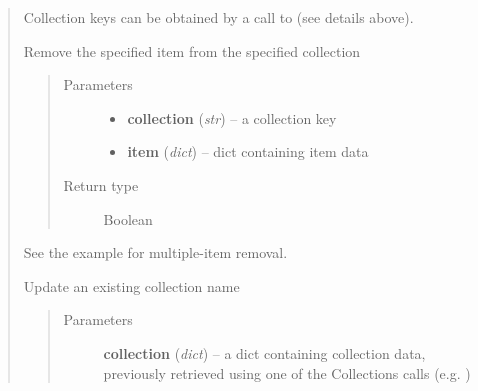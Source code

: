 \documentclass[letterpaper,10pt,english]{sphinxmanual}
\begin{document}
\begin{quote}
\begin{fulllineitems}
\begin{quote}
\begin{description}
\end{description}\end{quote}

Collection keys can be obtained by a call to {\hyperref[index:pyzotero.zotero.Zotero.collections]{}} (see details above).

\end{fulllineitems}


\begin{fulllineitems}
\label{index:pyzotero.zotero.Zotero.deletefrom_collection}
Remove the specified item from the specified collection
\begin{quote}\begin{description}
\item[{Parameters}] \leavevmode\begin{itemize}
\item {} 
\textbf{collection} (\emph{str}) -- a collection key

\item {} 
\textbf{item} (\emph{dict}) -- dict containing item data

\end{itemize}

\item[{Return type}] \leavevmode
Boolean

\end{description}\end{quote}

See the {\hyperref[index:pyzotero.zotero.Zotero.delete_item]{}} example for multiple-item removal.

\end{fulllineitems}


\begin{fulllineitems}
\label{index:pyzotero.zotero.Zotero.update_collection}
Update an existing collection name
\begin{quote}\begin{description}
\item[{Parameters}] \leavevmode
\textbf{collection} (\emph{dict}) -- a dict containing collection data, previously retrieved using one of the Collections calls (e.g. {\hyperref[index:pyzotero.zotero.Zotero.collections]{}})


\end{description}
\end{quote}
\end{fulllineitems}
\end{quote}
\end{document}

